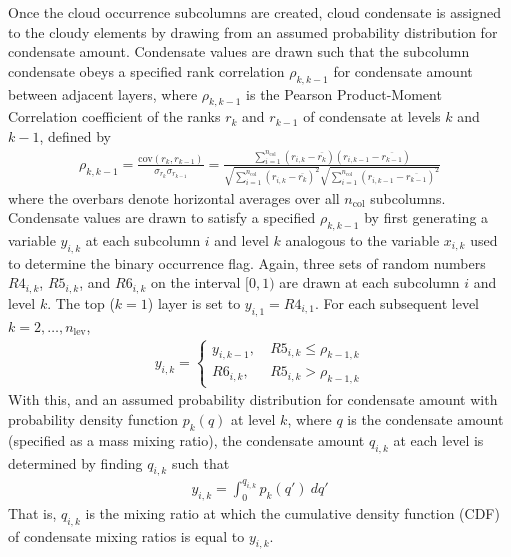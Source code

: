 Once the cloud occurrence subcolumns are created, cloud condensate is
assigned to the cloudy elements by drawing from an assumed probability
distribution for condensate amount. Condensate values are drawn such
that the subcolumn condensate obeys a specified rank correlation
\(\rho_{k, k-1}\) for condensate amount between adjacent layers, where
\(\rho_{k, k-1}\) is the Pearson Product-Moment Correlation coefficient
of the ranks \(r_{k}\) and \(r_{k-1}\) of condensate at levels \(k\) and
\(k-1\), defined by \begin{equation}\begin{gathered} \rho_{k, k-1}
= \frac{ \textrm{cov}(r_{k}, r_{k-1}) }{ \sigma_{r_{k}} \sigma_{r_{k-1}} } =
\frac{ \sum_{i=1}^{n_\textrm{col}} (r_{i, k} - \overline{r_{k}})(r_{i, k-1} -
\overline{r_{k-1}}) }{ \sqrt{\sum_{i=1}^{n_\textrm{col}} (r_{i, k} -
\overline{r_{k}})^2} \sqrt{\sum_{i=1}^{n_\textrm{col}} (r_{i, k-1} -
\overline{r_{k-1}})^2} } \end{gathered}\label{eq:rankcorr_equation}\end{equation}
where the overbars denote horizontal averages over all
\(n_\textrm{col}\) subcolumns. Condensate values are drawn to satisfy a
specified \(\rho_{k, k-1}\) by first generating a variable \(y_{i, k}\)
at each subcolumn \(i\) and level \(k\) analogous to the variable
\(x_{i, k}\) used to determine the binary occurrence flag. Again, three
sets of random numbers \(R4_{i, k}\), \(R5_{i, k}\), and \(R6_{i, k}\)
on the interval \([0, 1)\) are drawn at each subcolumn \(i\) and level
\(k\). The top (\(k = 1\)) layer is set to \(y_{i, 1} = R4_{i, 1}\). For
each subsequent level \(k = 2, \ldots, n_\textrm{lev}\),
\[\begin{gathered} y_{i, k} = \begin{cases} y_{i, k-1},
~ & R5_{i, k} \le \rho_{k-1, k} \\ R6_{i, k},  ~ & R5_{i, k} > \rho_{k-1, k}
\end{cases}\end{gathered}\] With this, and an assumed probability
distribution for condensate amount with probability density function
\(p_k(q)\) at level \(k\), where \(q\) is the condensate amount
(specified as a mass mixing ratio), the condensate amount \(q_{i, k}\)
at each level is determined by finding \(q_{i, k}\) such that
\[\begin{gathered} y_{i, k} = \int_0^{q_{i, k}} p_{k}(q')
~dq'\end{gathered}\] That is, \(q_{i, k}\) is the mixing ratio at which
the cumulative density function (CDF) of condensate mixing ratios is
equal to \(y_{i, k}\).

